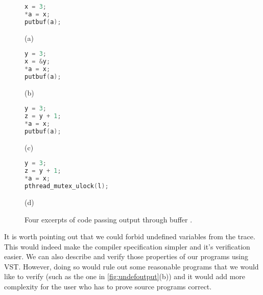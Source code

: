 \begin{figure}\centering
\begin{multicols}{4}
\begin{lstlisting}[language=C]
x = 3;
*a = x;
putbuf(a);
\end{lstlisting}

(a)

\begin{lstlisting}[language=C]
y = 3;
x = &y;
*a = x;
putbuf(a);
\end{lstlisting}

(b)

\begin{lstlisting}[language=C]
y = 3;
z = y + 1;
*a = x;
putbuf(a);
\end{lstlisting}

(c)

\columnbreak
\begin{lstlisting}[language=C]
y = 3;
z = y + 1;
*a = x;
pthread_mutex_ulock(l);
\end{lstlisting}

(d)
\end{multicols}
\caption[Code examples: passing output though a buffer.]{Four excerpts of code passing output through buffer .}
\label{fig:undefoutput}
\end{figure}

It is worth pointing out that we could forbid undefined variables from the trace. This would indeed make the compiler specification simpler and it's verification easier. We can also describe and verify those properties of our programs using VST\cite{appel14:plcc}. However, doing so would rule out some reasonable programs that we would like to verify (such as  the one in \autoref{fig:undefoutput}(b)) and it would add more complexity for the user who has to prove source programs correct. 
 




